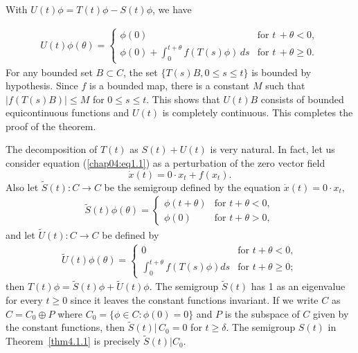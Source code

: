 \documentclass{surv-l}
\theoremstyle{plain}
\theoremstyle{definition}
\numberwithin{equation}{section}
\numberwithin{figure}{chapter}
\begin{document}
With $ U(t)\phi=T(t)\phi-S(t)\phi$, we have

\begin{align*}
U(t)\phi(\theta)=\left\{\begin{array}{ll}
\phi(0) & \text{for } t\,+\theta<0,\\
\phi(0)+\displaystyle\int_{0}^{t+\theta}f(T(s)\phi)\,ds & \text{for } t\,+\theta\geq 0.
\end{array}\right.
\end{align*}
For any bounded set $B\subset C$, the set $\{T(s)B, 0\leq s\leq t\}$ is bounded by hypothesis. Since $f$ is a bounded map, there is a constant $M$ such that $|f(T(s)B)|\leq M$ for $0\leq s \leq t$. This shows that $U(t)B$ consists of bounded equicontinuous functions and $U(t)$ is completely continuous. This completes the proof of the theorem.

The decomposition of $T(t)$ as $S(t)+ U(t)$ is very natural. In fact, let us consider equation ({\ref{chap04:eq1.1}}) as a perturbation of the zero vector field
\begin{equation*}
\dot{x}(t)=0\cdot x_{t}+f(x_{t}).
\end{equation*}
Also let $\tilde{S}(t)\!:C\rightarrow C$ be the semigroup defined by the equation $\dot{x}(t)=0\cdot x_{t}$,
\begin{align*}
\tilde{S}(t)\phi(\theta)=\left\{\begin{array}{ll}
\phi(t+\theta) & \text{for } t+\theta<0,\\
\phi(0) &\text{for } t+\theta>0,
\end{array}\right.
\end{align*}
and let $\tilde{U}(t)\!:C\rightarrow C$ be defined by
\begin{align*}
\tilde{U}(t)\phi(\theta)=\left\{\begin{array}{ll}
0 & \text{for } t+\theta<0,\\
\displaystyle\int_{0}^{t+\theta}f(T(s)\phi)ds & \text{for } t+\theta\geq 0;
\end{array}\right.
\end{align*}
then $ T(t)\phi=\tilde{S}(t)\phi+\tilde{U}(t)\phi$. The semigroup $\tilde{S}(t)$ has 1 as an eigenvalue for every $t\geq 0$ since it leaves the constant functions invariant. If we write $C$ as $C=C_{0}\oplus P$ where $C_{0}=\{\phi\in C\!:\phi(0)=0\}$ and $P$ is the subspace of $C$ given by the constant functions, then $\tilde{S}(t)|\,C_{0}=0$ for $ t\geq\delta$. The semigroup $S(t)$ in Theorem~\ref{thm4.1.1} is precisely $\tilde{S}(t)|C_{0}$.
\end{document}

